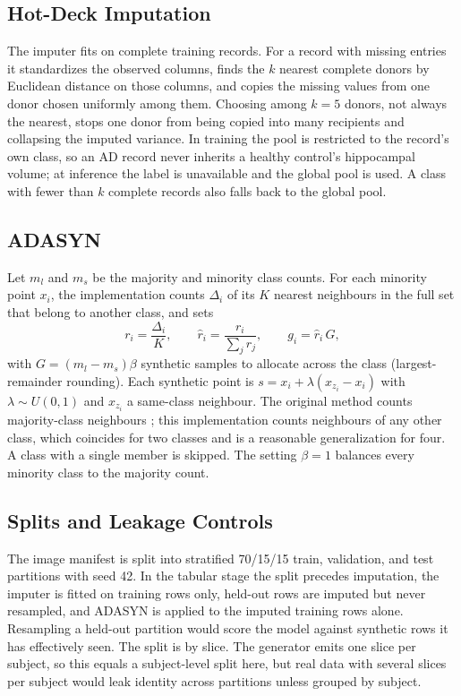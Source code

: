 \documentclass[conference]{IEEEtran}
\begin{document}
\subsection{Hot-Deck Imputation}
The imputer fits on complete training records. For a record with missing entries it standardizes the observed columns, finds the $k$ nearest complete donors by Euclidean distance on those columns, and copies the missing values from one donor chosen uniformly among them. Choosing among $k=5$ donors, not always the nearest, stops one donor from being copied into many recipients and collapsing the imputed variance. In training the pool is restricted to the record's own class, so an AD record never inherits a healthy control's hippocampal volume; at inference the label is unavailable and the global pool is used. A class with fewer than $k$ complete records also falls back to the global pool.

\subsection{ADASYN}
Let $m_l$ and $m_s$ be the majority and minority class counts. For each minority point $x_i$, the implementation counts $\Delta_i$ of its $K$ nearest neighbours in the full set that belong to another class, and sets
\begin{equation}
r_i = \frac{\Delta_i}{K}, \qquad \hat r_i = \frac{r_i}{\sum_j r_j}, \qquad g_i = \hat r_i\, G,
\label{eq:adasyn}
\end{equation}
with $G=(m_l-m_s)\beta$ synthetic samples to allocate across the class (largest-remainder rounding). Each synthetic point is $s = x_i + \lambda (x_{z_i}-x_i)$ with $\lambda\sim U(0,1)$ and $x_{z_i}$ a same-class neighbour. The original method counts majority-class neighbours \cite{adasyn}; this implementation counts neighbours of any other class, which coincides for two classes and is a reasonable generalization for four. A class with a single member is skipped. The setting $\beta=1$ balances every minority class to the majority count.

\subsection{Splits and Leakage Controls}
The image manifest is split into stratified 70/15/15 train, validation, and test partitions with seed 42. In the tabular stage the split precedes imputation, the imputer is fitted on training rows only, held-out rows are imputed but never resampled, and ADASYN is applied to the imputed training rows alone. Resampling a held-out partition would score the model against synthetic rows it has effectively seen. The split is by slice. The generator emits one slice per subject, so this equals a subject-level split here, but real data with several slices per subject would leak identity across partitions unless grouped by subject.
\end{document}
